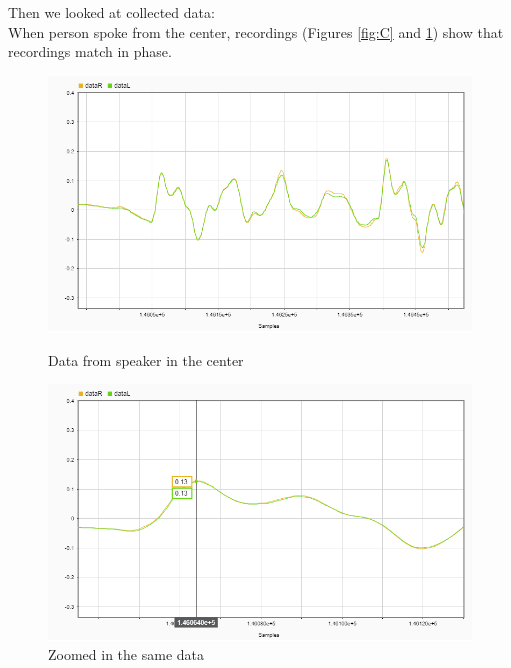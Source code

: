 Then we looked at collected data:\\
When person spoke from the center, recordings (Figures  \ref{fig:C} and \ref{fig:closeC}) show that recordings 
match in phase.\\
\begin{figure}[htp]
\centering
\begin{minipage}{.5\textwidth}
  \centering
  \includegraphics[width=1\linewidth]{Illustrations/DataC.png}
  \caption{Data from speaker in the center}
  \label{fig:C}
\end{minipage}%
\begin{minipage}{.5\textwidth}
  \centering
  \includegraphics[width=1\linewidth]{Illustrations/DataC_with_Markers.png}
  \caption{Zoomed in the same data}
  \label{fig:closeC}
\end{minipage}
\end{figure}

